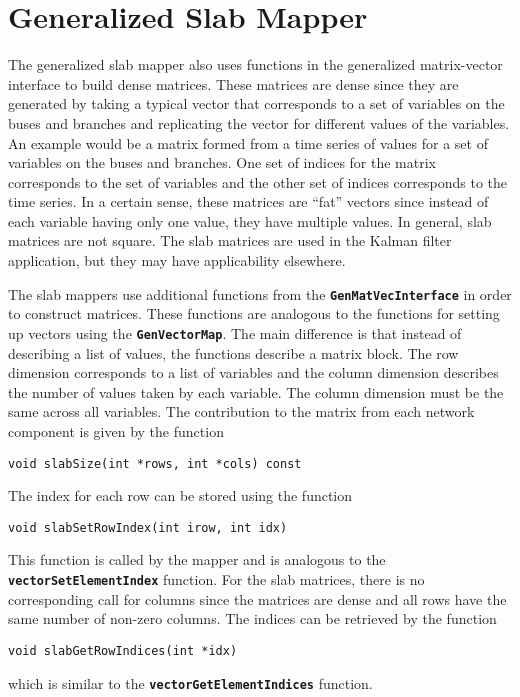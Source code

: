 \section{Generalized Slab Mapper}

The generalized slab mapper also uses functions in the generalized matrix-vector interface to build dense matrices. These matrices are dense since they are generated by taking a typical vector that corresponds to a set of variables on the buses and branches and replicating the vector for different values of the variables. An example would be a matrix formed from a time series of values for a set of variables on the buses and branches. One set of indices for the matrix corresponds to the set of variables and the other set of indices corresponds to the time series. In a certain sense, these matrices are ``fat'' vectors since instead of each variable having only one value, they have multiple values. In general, slab matrices are not square. The slab matrices are used in the Kalman filter application, but they may have applicability elsewhere.

The slab mappers use additional functions from the \texttt{\textbf{GenMatVecInterface}} in order to construct matrices. These functions are analogous to the functions for setting up vectors using the \texttt{\textbf{GenVectorMap}}. The main difference is that instead of describing a list of values, the functions describe a matrix block. The row dimension corresponds to a list of variables and the column dimension describes the number of values taken by each variable. The column dimension must be the same across all variables. The contribution to the matrix from each network component is given by the function

{
\color{red}
\begin{Verbatim}[fontseries=b]
void slabSize(int *rows, int *cols) const
\end{Verbatim}
}

The index for each row can be stored using the function

{
\color{red}
\begin{Verbatim}[fontseries=b]
void slabSetRowIndex(int irow, int idx)
\end{Verbatim}
}

This function is called by the mapper and is analogous to the \texttt{\textbf{vectorSetElementIndex}} function. For the slab matrices, there is no corresponding call for columns since the matrices are dense and all rows have the same number of non-zero columns. The indices can be retrieved by the function

{
\color{red}
\begin{Verbatim}[fontseries=b]
void slabGetRowIndices(int *idx)
\end{Verbatim}
}

which is similar to the \texttt{\textbf{vectorGetElementIndices}} function.
